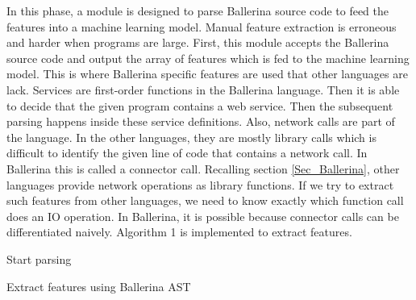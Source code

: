 In this phase, a module is designed to parse Ballerina source code to feed the features into a machine learning model. Manual feature extraction is erroneous and harder when programs are large. First, this module accepts the Ballerina source code and output the array of features which is fed to the machine learning model. This is where Ballerina specific features are used that other languages are lack. 
Services are first-order functions in the Ballerina language. Then it is able to decide that the given program contains a web service. Then the subsequent parsing happens inside these service definitions. Also, network calls are part of the language. In the other languages, they are mostly library calls which is difficult to identify the given line of code that contains a network call. In Ballerina this is called a connector call. Recalling section \ref{Sec_Ballerina}, other languages provide network operations as library functions. If we try to extract such features from other languages, we need to know exactly which function call does an IO operation. In Ballerina, it is possible because connector calls can be differentiated naively. Algorithm 1 is implemented to extract features.

\begin{algorithm} \label{alg:ast_parser}
	
	\SetAlgoLined
	Start parsing\;
	
	
	\caption{Extract features using Ballerina AST}
\end{algorithm}

